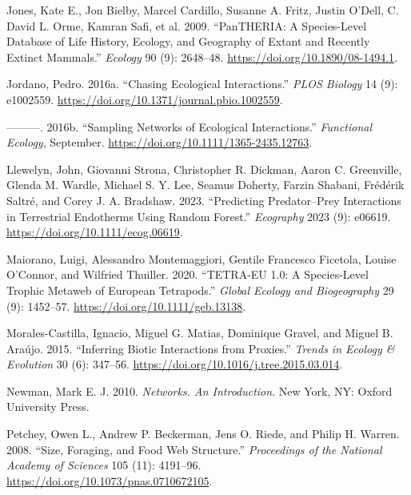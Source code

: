 \documentclass[
  letterpaper,
  DIV=11,
  numbers=noendperiod]{scrartcl}
\newlength{\cslhangindent}
\newenvironment{CSLReferences}[2] %
 {\begin{list}{}{%
  \setlength{\itemindent}{0pt}
  \setlength{\leftmargin}{0pt}
  \setlength{\parsep}{0pt}
  \ifodd #1
   \setlength{\leftmargin}{\cslhangindent}
   \setlength{\itemindent}{-1\cslhangindent}
  \fi
  \setlength{\itemsep}{#2\baselineskip}}}
 {\end{list}}
\begin{document}
\begin{CSLReferences}{1}{0}
Jones, Kate E., Jon Bielby, Marcel Cardillo, Susanne A. Fritz, Justin
O'Dell, C. David L. Orme, Kamran Safi, et al. 2009. {``{PanTHERIA}: A
Species-Level Database of Life History, Ecology, and Geography of Extant
and Recently Extinct Mammals.''} \emph{Ecology} 90 (9): 2648--48.
\url{https://doi.org/10.1890/08-1494.1}.

Jordano, Pedro. 2016a. {``Chasing {Ecological Interactions}.''}
\emph{PLOS Biology} 14 (9): e1002559.
\url{https://doi.org/10.1371/journal.pbio.1002559}.

---------. 2016b. {``Sampling Networks of Ecological Interactions.''}
\emph{Functional Ecology}, September.
\url{https://doi.org/10.1111/1365-2435.12763}.

Llewelyn, John, Giovanni Strona, Christopher R. Dickman, Aaron C.
Greenville, Glenda M. Wardle, Michael S. Y. Lee, Seamus Doherty, Farzin
Shabani, Frédérik Saltré, and Corey J. A. Bradshaw. 2023. {``Predicting
Predator--Prey Interactions in Terrestrial Endotherms Using Random
Forest.''} \emph{Ecography} 2023 (9): e06619.
\url{https://doi.org/10.1111/ecog.06619}.

Maiorano, Luigi, Alessandro Montemaggiori, Gentile Francesco Ficetola,
Louise O'Connor, and Wilfried Thuiller. 2020. {``{TETRA-EU} 1.0: {A}
Species-Level Trophic Metaweb of {European} Tetrapods.''} \emph{Global
Ecology and Biogeography} 29 (9): 1452--57.
\url{https://doi.org/10.1111/geb.13138}.

Morales-Castilla, Ignacio, Miguel G. Matias, Dominique Gravel, and
Miguel B. Araújo. 2015. {``Inferring Biotic Interactions from
Proxies.''} \emph{Trends in Ecology \& Evolution} 30 (6): 347--56.
\url{https://doi.org/10.1016/j.tree.2015.03.014}.

Newman, Mark E. J. 2010. \emph{Networks. {An} Introduction}. New York,
NY: Oxford University Press.

Petchey, Owen L., Andrew P. Beckerman, Jens O. Riede, and Philip H.
Warren. 2008. {``Size, Foraging, and Food Web Structure.''}
\emph{Proceedings of the National Academy of Sciences} 105 (11):
4191--96. \url{https://doi.org/10.1073/pnas.0710672105}.


\end{CSLReferences}
\end{document}
